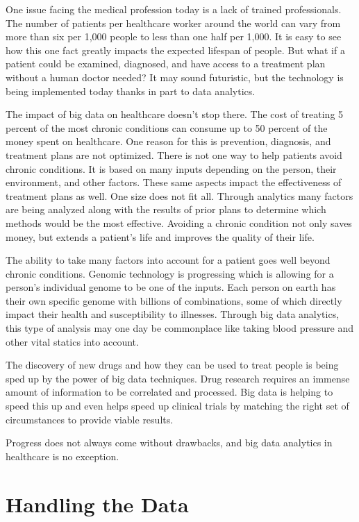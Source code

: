 \documentclass[sigconf]{acmart}
\begin{document}
One issue facing the medical profession today is a lack of trained 
professionals.  The number of patients per healthcare worker around 
the world can vary from more than six per 1,000 people to less than 
one half per 1,000\cite{WHODensity}.  It is easy to see how this 
one fact greatly impacts the expected lifespan of people.  But 
what if a patient could be examined, diagnosed, and have access to 
a treatment plan without a human doctor needed?  It may sound 
futuristic, but the technology is being implemented today thanks 
in part to data analytics.   

The impact of big data on healthcare doesn't stop there.  The 
cost of treating 5 percent of the most chronic conditions can 
consume up to 50 percent of the money spent on 
healthcare\cite{Optum}.  One reason for this is prevention, 
diagnosis, and treatment plans are not optimized.  There is not 
one way to help patients avoid chronic conditions.  It is based 
on many inputs depending on the person, their environment, and 
other factors.  These same aspects impact the effectiveness of 
treatment plans as well.  One size does not fit all.  Through 
analytics many factors are being analyzed along with the results 
of prior plans to determine which methods would be the most 
effective.  Avoiding a chronic condition not only saves money, 
but extends a patient's life and improves the quality of their 
life.  

The ability to take many factors into account for a patient goes 
well beyond chronic conditions.  Genomic technology is 
progressing which is allowing for a person's individual genome to 
be one of the inputs.  Each person on earth has their own specific 
genome with billions of combinations, some of which directly 
impact their health and susceptibility to illnesses.  Through big 
data analytics, this type of analysis may one day be commonplace 
like taking blood pressure and other vital statics into account.  

The discovery of new drugs and how they can be used to treat 
people is being sped up by the power of big data techniques.  
Drug research requires an immense amount of information to be 
correlated and processed.  Big data is helping to speed this up 
and even helps speed up clinical trials by matching the right set 
of circumstances to provide viable results.  

Progress does not always come without drawbacks, and big data 
analytics in healthcare is no exception.

\section{Handling the Data}
\end{document}
